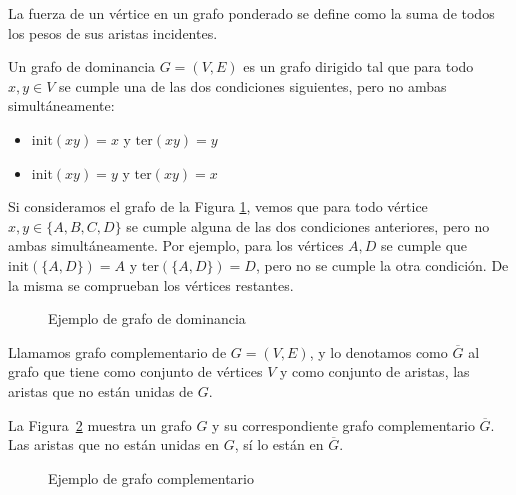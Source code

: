 \begin{defi}
La fuerza de un vértice en un grafo ponderado se define como la suma de todos los pesos de sus aristas incidentes.
\end{defi}

\begin{defi} \label{def:dominancia}
Un grafo de dominancia $G=(V,E)$ es un grafo dirigido tal que para todo $x,y \in V$ se cumple una de las dos condiciones siguientes, pero no ambas simultáneamente:

\begin{itemize}
\item $\mathrm{init}(xy) = x$ \quad y \quad $\mathrm{ter}(xy) = y$
\item $\mathrm{init}(xy) = y$ \quad y \quad $\mathrm{ter}(xy) = x$ 
\end{itemize}
\end{defi}

\begin{ejemplo}
Si consideramos el grafo de la Figura \ref{fig:grafo_dominancia}, vemos que para todo vértice $x,y \in \{A, B, C, D\}$ se cumple alguna de las dos condiciones anteriores, pero no ambas simultáneamente. Por ejemplo, para los vértices $A, D$ se cumple que $\mathrm{init}(\{A,D\}) = A$ y $\mathrm{ter}(\{A,D\}) = D$, pero no se cumple la otra condición. De la misma se comprueban los vértices restantes.   

\begin{figure}[h]
\centering
\ejemplografodominancia
\caption{Ejemplo de grafo de dominancia}
\label{fig:grafo_dominancia}
\end{figure}
\end{ejemplo}

\begin{defi}
Llamamos grafo complementario de $G = (V,E)$, y lo denotamos como $\overline{G}$ al grafo que tiene como conjunto de vértices $V$ y como conjunto de aristas, las aristas que no están unidas de $G$.
\end{defi}

\begin{ejemplo}

La Figura~\ref{fig:grafo_complementario} muestra un grafo $G$ y su correspondiente grafo complementario $\overline{G}$. Las aristas que no están unidas en $G$, sí lo están en $\overline{G}$.

\begin{figure}[h]
\centering
\ejemplografocomplementario
\caption{Ejemplo de grafo complementario}
\label{fig:grafo_complementario}
\end{figure}
\end{ejemplo}
